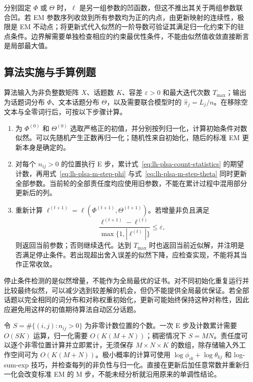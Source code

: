分别固定 $\Phi$ 或 $\Theta$ 时，$\ell$ 是另一组参数的凹函数，但这不推出其关于两组参数联合凹。若 EM 参数序列收敛到所有参数均为正的内点，由更新映射的连续性，极限是 EM 不动点；将更新式代入似然的一阶导数可验证其满足归一化约束下的驻点条件。边界解需要单独检查相应的约束最优性条件，不能由似然值收敛直接断言是局部最大值。

\subsection{算法实施与手算例题}
\label{subsec:lh-plsa-em-implementation}

算法输入为非负整数矩阵 $X$、话题数 $K$、容差 $\varepsilon>0$ 和最大迭代次数 $T_{\max}$；输出为话题词分布 $\Phi$、文本话题分布 $\Theta$，以及需要联合模型时的 $\widehat\pi_j=L_j/n$。在移除空文本与全零词行后，可按以下步骤计算。
\begin{enumerate}
\item 为 $\Phi^{(0)}$ 和 $\Theta^{(0)}$ 选取严格正的初值，并分别按列归一化，计算初始条件对数似然。可以先随机产生正数再归一化；随机性来自初始化，随后的标准 EM 更新本身是确定的。
\item 对每个 $n_{ij}>0$ 的位置执行 E 步，累计式~\eqref{eq:lh-plsa-count-statistics} 的期望计数，再用式~\eqref{eq:lh-plsa-m-step-phi} 与式~\eqref{eq:lh-plsa-m-step-theta} 同时更新全部参数。当前轮的全部责任度均应使用旧参数，不能在累计过程中混用部分更新后的列。
\item 重新计算 $\ell^{(t+1)}=\ell(\Phi^{(t+1)},\Theta^{(t+1)})$。若增量非负且满足
\[
\frac{\ell^{(t+1)}-\ell^{(t)}}{\max\{1,|\ell^{(t)}|\}}
\leq\varepsilon,
\]
则返回当前参数；否则继续迭代。达到 $T_{\max}$ 时也返回当前近似解，并注明是否满足停止条件。若出现超出舍入误差的似然下降，应检查实现，不能将其当作正常收敛。
\end{enumerate}
停止条件检测的是似然增量，不能作为全局最优的证书。对不同初始化重复运行并比较最终似然，可以减少选到较差解的机会，但仍不能提供全局最优保证。若全部话题以完全相同的词分布和对称权重初始化，更新可能始终保持这种对称性，因此应避免用这样的初值期待算法自动区分话题。

令 $S=\#\{(i,j):n_{ij}>0\}$ 为非零计数位置的个数。一次 E 步及计数累计需要 $O(SK)$ 运算，归一化需要 $O(K(M+N))$；稠密情况下 $S=MN$。责任度可以逐个非零位置计算并立即累计，无须保存 $M\times N\times K$ 的数组，除存储输入外工作空间可为 $O(K(M+N))$。极小概率的计算可使用 $\log\phi_{ik}+\log\theta_{kj}$ 和 log-sum-exp 技巧，并检查每列的非负性与归一化。直接在更新后加任意常数并重新归一化会改变标准 EM 的 M 步，不能未经分析就沿用原来的单调性结论。

